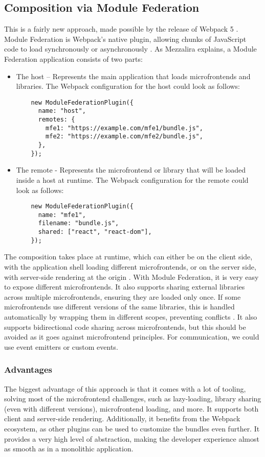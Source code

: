 \subsection{Composition via Module Federation}
This is a fairly new approach, made possible by the release of Webpack 5 \cite{Taibi}. Module Federation is Webpack's native plugin, allowing chunks of JavaScript code to load synchronously or asynchronously \cite{MezzaliraBuildingMf}. As Mezzalira \cite{MezzaliraBuildingMf} explains, a Module Federation application consists of two parts:
\begin{itemize}
  \item The host – Represents the main application that loads microfrontends and libraries. The Webpack configuration for the host could look as follows:
  \begin{verbatim}
    new ModuleFederationPlugin({
      name: "host",
      remotes: {
        mfe1: "https://example.com/mfe1/bundle.js",
        mfe2: "https://example.com/mfe2/bundle.js",
      },
    });
  \end{verbatim}
  \item The remote - Represents the microfrontend or library that will be loaded inside a host at runtime. The Webpack configuration for the remote could look as follows:
  \begin{verbatim}
    new ModuleFederationPlugin({
      name: "mfe1",
      filename: "bundle.js",
      shared: ["react", "react-dom"],
    });
  \end{verbatim}
\end{itemize}
The composition takes place at runtime, which can either be on the client side, with the application shell loading different microfrontends, or on the server side, with server-side rendering at the origin \cite{MezzaliraBuildingMf}. With Module Federation, it is very easy to expose different microfrontends. It also supports sharing external libraries across multiple microfrontends, ensuring they are loaded only once. If some microfrontends use different versions of the same libraries, this is handled automatically by wrapping them in different scopes, preventing conflicts \cite{MezzaliraBuildingMf}. It also supports bidirectional code sharing across microfrontends, but this should be avoided as it goes against microfrontend principles. For communication, we could use event emitters or custom events.

\subsubsection{Advantages}
The biggest advantage of this approach is that it comes with a lot of tooling, solving most of the microfrontend challenges, such as lazy-loading, library sharing (even with different versions), microfrontend loading, and more. It supports both client and server-side rendering. Additionally, it benefits from the Webpack ecosystem, as other plugins can be used to customize the bundles even further. It provides a very high level of abstraction, making the developer experience almost as smooth as in a monolithic application.

